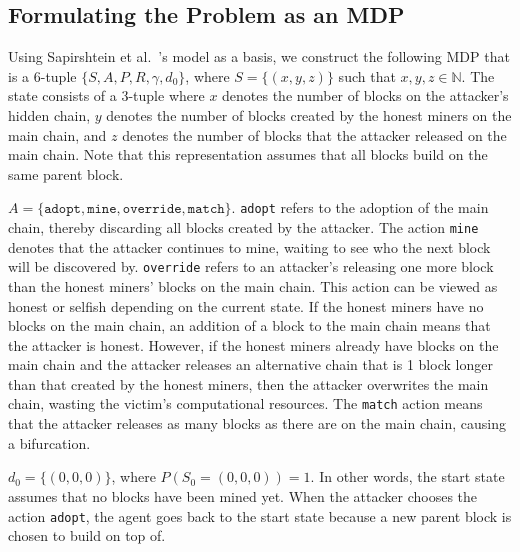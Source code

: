 \subsection{Formulating the Problem as an MDP}
 Using Sapirshtein et al.~\cite{sapirshtein:2015}'s model as a basis, we construct the following MDP that is a 6-tuple $\{S, A, P, R, \gamma, d_0\}$, where $S = \{(x, y, z)\}$ such that $x, y, z \in \mathbb{N}$. The state consists of a 3-tuple where $x$ denotes the number of blocks on the attacker's hidden chain, $y$ denotes the number of blocks created by the honest miners on the main chain, and $z$ denotes the number of blocks that the attacker released on the main chain. Note that this representation assumes that all blocks build on the same parent block. 

 $A = \{\texttt{adopt}, \texttt{mine}, \texttt{override}, \texttt{match}\}$. \texttt{adopt} refers to the adoption of the main chain, thereby discarding all blocks created by the attacker. The action \texttt{mine} denotes that the attacker continues to mine, waiting to see who the next block will be discovered by. \texttt{override} refers to an attacker's releasing one more block than the honest miners' blocks on the main chain. This action can be viewed as honest or selfish depending on the current state. If the honest miners have no blocks on the main chain, an addition of a block to the main chain means that the attacker is honest. However, if the honest miners already have blocks on the main chain and the attacker releases an alternative chain that is 1 block longer than that created by the honest miners, then the attacker overwrites the main chain, wasting the victim's computational resources. The \texttt{match} action means that the attacker releases as many blocks as there are on the main chain, causing a bifurcation.

 $d_0 = \{(0, 0, 0)\}$, where $P(S_0 = (0, 0, 0)) = 1$. In other words, the start state assumes that no blocks have been mined yet. When the attacker chooses the action  \texttt{adopt}, the agent goes back to the start state because a new parent block is chosen to build on top of.

